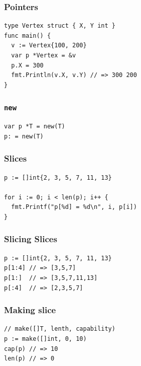 \documentclass[xetex,mathserif,serif,12pt]{beamer}
\begin{document}
\begin{frame}[fragile]
  \frametitle{Pointers}

  \begin{beamer@nomargin}
    \begin{lstlisting}
type Vertex struct { X, Y int }
func main() {
  v := Vertex{100, 200}
  var p *Vertex = &v
  p.X = 300
  fmt.Println(v.X, v.Y) // => 300 200
}
    \end{lstlisting}
  \end{beamer@nomargin}
\end{frame}

\begin{frame}[fragile]
  \frametitle{\texttt{new}}

  \begin{beamer@nomargin}
    \begin{lstlisting}
var p *T = new(T)
p: = new(T)
    \end{lstlisting}
  \end{beamer@nomargin}
\end{frame}

\begin{frame}[fragile]
  \frametitle{Slices}

  \begin{beamer@nomargin}
    \begin{lstlisting}
p := []int{2, 3, 5, 7, 11, 13}

for i := 0; i < len(p); i++ {
  fmt.Printf("p[%d] = %d\n", i, p[i])
}
    \end{lstlisting}
  \end{beamer@nomargin}
\end{frame}

\begin{frame}[fragile]
  \frametitle{Slicing Slices}

  \begin{beamer@nomargin}
    \begin{lstlisting}
p := []int{2, 3, 5, 7, 11, 13}
p[1:4] // => [3,5,7]
p[1:]  // => [3,5,7,11,13]
p[:4]  // => [2,3,5,7]
    \end{lstlisting}
  \end{beamer@nomargin}
\end{frame}

\begin{frame}[fragile]
  \frametitle{Making slice}

  \begin{beamer@nomargin}
    \begin{lstlisting}
// make([]T, lenth, capability)
p := make([]int, 0, 10)
cap(p) // => 10
len(p) // => 0
    \end{lstlisting}
  \end{beamer@nomargin}
\end{frame}
\end{document}
